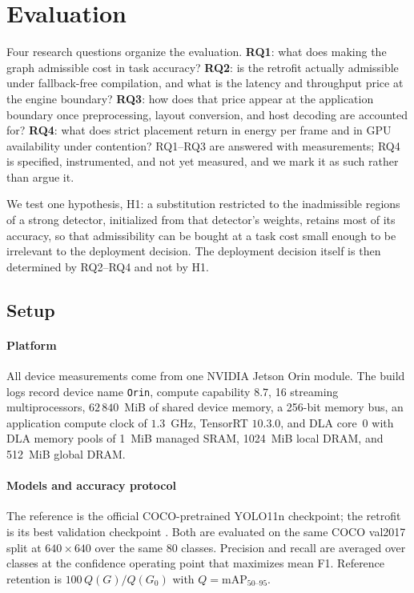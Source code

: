 \section{Evaluation}
\label{sec:eval}

Four research questions organize the evaluation. \textbf{RQ1}: what does making
the graph admissible cost in task accuracy? \textbf{RQ2}: is the retrofit
actually admissible under fallback-free compilation, and what is the latency and
throughput price at the engine boundary? \textbf{RQ3}: how does that price
appear at the application boundary once preprocessing, layout conversion, and
host decoding are accounted for? \textbf{RQ4}: what does strict placement return
in energy per frame and in GPU availability under contention? RQ1--RQ3 are
answered with measurements; RQ4 is specified, instrumented, and not yet
measured, and we mark it as such rather than argue it.

We test one hypothesis, H1: a substitution restricted to the inadmissible
regions of a strong detector, initialized from that detector's weights, retains
most of its accuracy, so that admissibility can be bought at a task cost small
enough to be irrelevant to the deployment decision. The deployment decision
itself is then determined by RQ2--RQ4 and not by H1.

\subsection{Setup}
\label{sec:setup}

\paragraph*{Platform}
All device measurements come from one NVIDIA Jetson Orin module. The build logs
record device name \texttt{Orin}, compute capability $8.7$, 16 streaming
multiprocessors, $62\,840$~MiB of shared device memory, a 256-bit memory bus, an
application compute clock of $1.3$~GHz, TensorRT $10.3.0$, and DLA core~0 with
DLA memory pools of 1~MiB managed SRAM, 1024~MiB local DRAM, and 512~MiB global
DRAM. 

\paragraph*{Models and accuracy protocol}
The reference is the official COCO-pretrained YOLO11n checkpoint; the retrofit
is its best validation checkpoint . Both are evaluated on the same COCO val2017
split \cite{lin2014coco} at $640\times640$ over the same 80 classes. Precision
and recall are averaged over classes at the confidence operating point that
maximizes mean F1. Reference retention is $100\,Q(G)/Q(G_0)$ with
$Q=\mathrm{mAP}_{50\text{--}95}$.

